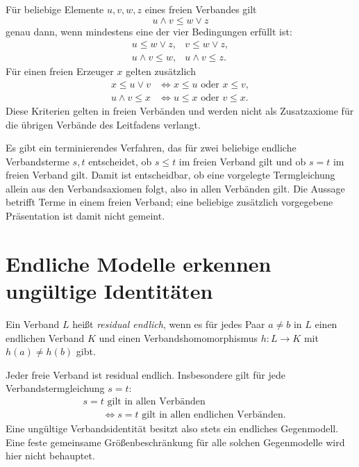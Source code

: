 \begin{theorem}
\label{b45guide:thm:whitman}
Für beliebige Elemente $u,v,w,z$ eines freien Verbandes gilt
\[
 u\wedge v\leq w\vee z
\]
genau dann, wenn mindestens eine der vier Bedingungen erfüllt ist:
\[
 \begin{array}{ll}
 u\leq w\vee z,&v\leq w\vee z,\\
 u\wedge v\leq w,&u\wedge v\leq z .
 \end{array}
\]
Für einen freien Erzeuger $x$ gelten zusätzlich
\[
\begin{aligned}
 x\leq u\vee v&\iff x\leq u\text{ oder }x\leq v,\\
 u\wedge v\leq x&\iff u\leq x\text{ oder }v\leq x .
\end{aligned}
\]
Diese Kriterien gelten in freien Verbänden und werden nicht
als Zusatzaxiome für die übrigen Verbände des Leitfadens verlangt.
\cite{nation-free,fjn}
\end{theorem}

\begin{theorem}
\label{b45guide:thm:word-problem}
Es gibt ein terminierendes Verfahren, das für zwei beliebige
endliche Verbandsterme $s,t$ entscheidet, ob $s\leq t$ im
freien Verband gilt und ob $s=t$ im freien Verband gilt.
Damit ist entscheidbar, ob eine vorgelegte Termgleichung allein
aus den Verbandsaxiomen folgt, also in allen Verbänden gilt.
Die Aussage betrifft Terme in einem freien Verband; eine beliebige
zusätzlich vorgegebene Präsentation ist damit nicht gemeint.
\cite{nation-free,fjn}
\end{theorem}

\section{Endliche Modelle erkennen ungültige Identitäten}

\begin{definition}
Ein Verband $L$ heißt \emph{residual endlich}, wenn es für
jedes Paar $a\ne b$ in $L$ einen endlichen Verband $K$ und
einen Verbandshomomorphismus $h:L\to K$ mit $h(a)\ne h(b)$ gibt.
\end{definition}

\begin{theorem}
\label{b45guide:thm:residual}
Jeder freie Verband ist residual endlich.
Insbesondere gilt für jede Verbandstermgleichung $s=t$:
\[
\begin{aligned}
 &s=t\text{ gilt in allen Verbänden}\\
 &\qquad\Longleftrightarrow
 s=t\text{ gilt in allen endlichen Verbänden}.
\end{aligned}
\]
Eine ungültige Verbandsidentität besitzt also stets ein endliches
Gegenmodell. Eine feste gemeinsame Größenbeschränkung für alle
solchen Gegenmodelle wird hier nicht behauptet.
\cite{dean,freese-free}
\end{theorem}
